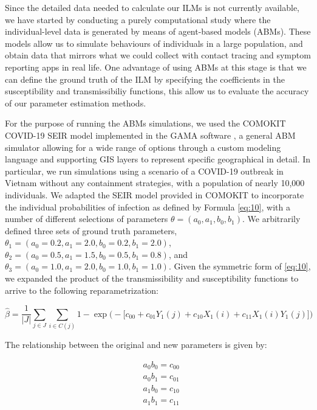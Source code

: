 \documentclass{article}
\begin{document}
Since the detailed data needed to calculate our ILMs is not currently available, we have started by conducting a purely computational study where the individual-level data is generated by means of  agent-based models (ABMs). These models allow us to simulate behaviours of individuals in a large population, and obtain data that mirrors what we could collect with contact tracing and symptom reporting apps in real life. One advantage of using ABMs at this stage is that we can define the ground truth of the ILM by specifying the coefficients in the susceptibility and transmissibiliy functions, this allow us to evaluate the accuracy of our parameter estimation methods. 

For the purpose of running the ABMs simulations, we used the COMOKIT COVID-19 SEIR model \cite{Drogoul2020} implemented in the GAMA software \cite{Taillandier2019}, a general ABM simulator allowing for a wide range of options through a custom modeling language and supporting GIS layers to represent specific geographical in detail. In particular, we run simulations using a scenario of a COVID-19 outbreak in Vietnam without any containment strategies, with a population of nearly 10,000 individuals. We adapted the SEIR model provided in COMOKIT to incorporate the individual probabilities of infection as defined by Formula \eqref{eq:10}, with a number of different selections of parameters $\theta=(a_0, a_1, b_0, b_1)$. We arbitrarily defined three sets of ground truth parameters, $\theta_1=(a_0=0.2, a_1=2.0, b_0=0.2, b_1=2.0)$, $\theta_2=(a_0=0.5, a_1=1.5, b_0=0.5, b_1=0.8)$, and $\theta_3=(a_0=1.0, a_1=2.0, b_0=1.0, b_1=1.0)$. Given the symmetric form of \eqref{eq:10}, we expanded the product of the transmissibility and susceptibility functions to arrive to the following reparametrization: 

\begin{equation}
\hat{\beta} = \frac{1}{|J|} \sum\limits_{j \in J}\sum\limits_{i \in C(j)}  1-\exp\Big(- \big[c_{00} + c_{01} Y_1(j) + c_{10} X_1(i) + c_{11} X_1(i) Y_1(j)]\Big)
\end{equation}

The relationship between the original and new parameters is given by:

\begin{equation}
\begin{aligned}
& a_0 b_0= c_{00} \\
& a_0 b_1= c_{01} \\
& a_1 b_0= c_{10} \\
& a_1 b_1= c_{11}
\end{aligned}
\end{equation}
\end{document}
